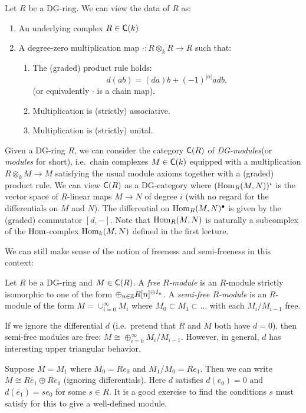 \documentclass{amsart}
\begin{document}
Let $R$ be a DG-ring.
We can view the data of $R$ as:
\begin{enumerate}
	\item An underlying complex $R \in \mathsf{C}(k)$
	\item A degree-zero multiplication map $\cdot: R \otimes_k R \to R$ such that:
	\begin{enumerate}
		\item The (graded) product rule holds:
		\[
			d(ab) = (da) b + (-1)^{|a|} a db,
		\]
		(or equivalently $\cdot$ is a chain map).
		\item Multiplication is (strictly) associative.
		\item Multiplication is (strictly) unital.
	\end{enumerate}
\end{enumerate}

Given a DG-ring $R$, we can consider the category $\mathsf{C}(R)$ of \emph{DG-modules}(or \emph{modules} for short), i.e.\ chain complexes $M \in \mathsf{C}(k)$ equipped with a multiplication $R \otimes_k M \to M$ satisfying the usual module axioms together with a (graded) product rule.
We can view $\mathsf{C}(R)$ as a DG-category where $(\operatorname{Hom}_R(M, N))^i$ is the vector space of $R$-linear maps $M \to N$ of degree $i$ (with no regard for the differentials on $M$ and $N$).
The differential on $\operatorname{Hom}_R(M, N)^\bullet$ is given by the (graded) commutator $[d, -]$.
Note that $\operatorname{Hom}_R(M, N)$ is naturally a subcomplex of the $\operatorname{Hom}$-complex $\operatorname{Hom}_k(M, N)$ defined in the first lecture.

We can still make sense of the notion of freeness and semi-freeness in this context:

\begin{dfn}
	Let $R$ be a DG-ring and $M \in \mathsf{C}(R)$.
	A \emph{free $R$-module} is an $R$-module strictly isomorphic to one of the form $\oplus_{n \in \mathbb{Z}} R[n]^{\oplus I_n}$.
	A \emph{semi-free $R$-module} is an $R$-module of the form $M = \cup_{i=0}^\infty M_i$ where $M_0 \subset M_1 \subset \dots$ with each $M_i / M_{i-1}$ free.
\end{dfn}

If we ignore the differential $d$ (i.e.\ pretend that $R$ and $M$ both have $d = 0$), then semi-free modules are free: $M \cong \oplus_{i=0}^\infty M_i / M_{i-1}$.
However, in general, $d$ has interesting upper triangular behavior.

\begin{ex}
	Suppose $M = M_1$ where $M_0 = R e_0$ and $M_1 / M_0 = R e_1$.
	Then we can write $M \cong R \tilde{e_1} \oplus R e_0$ (ignoring differentials).
	Here $d$ satisfies $d(e_0) = 0$ and $d(\tilde{e_1}) = s e_0$ for some $s \in R$.
	It is a good exercise to find the conditions $s$ must satisfy for this to give a well-defined module.
\end{ex}
\end{document}
